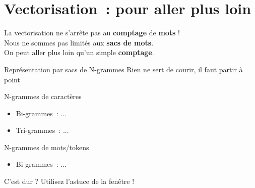 \documentclass[serif, aspectratio=169]{beamer}
\begin{document}
\section{Vectorisation~: pour aller plus loin}

\begin{exoframe}
    \begin{center}
        \Large
        La vectorisation ne s'arrête pas au \textbf{comptage} de \textbf{mots} ! \\
        \vspace{20pt}
        Nous ne sommes pas limités aux \textbf{sacs de mots}. \\
        On peut aller plus loin qu'un simple \textbf{comptage}. 
    \end{center}
\end{exoframe}

\begin{frame}{Représentation par sacs de N-grammes}
    \pause
    Rien ne sert de courir, il faut partir à point
    \vfill
    \begin{block}{N-grammes de caractères}
        \begin{itemize}
            \item Bi-grammes~:     ...
            \item Tri-grammes~:     ...
        \end{itemize}
    \end{block}
    \vfill
    \begin{block}{N-grammes de mots/tokens}
        \begin{itemize}
            \item Bi-grammes~:     ...
        \end{itemize}
    \end{block}
    \vfill
    \begin{center}
        \Large
        C'est dur ? Utilisez l'astuce de la fenêtre !
    \end{center}
\end{frame}
\end{document}
